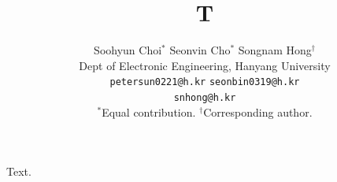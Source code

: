 \documentclass{article}
\begin{document}
\title{T}
\author{Soohyun Choi$^{*}$ \qquad Seonvin Cho$^{*}$ \qquad Songnam Hong$^{\dagger}$\\ Dept of Electronic Engineering, Hanyang University\\ \texttt{petersun0221@h.kr} \quad \texttt{seonbin0319@h.kr}\\ \texttt{snhong@h.kr}\\ {\small $^{*}$Equal contribution. $^{\dagger}$Corresponding author.}}
\maketitle
Text.
\end{document}
